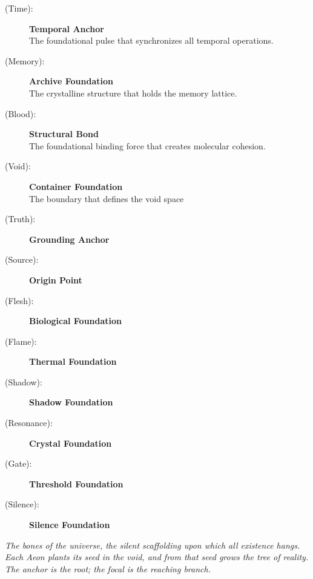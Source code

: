 \begin{description}
    \item[(Time):] \fetuahl {} \textbf{Temporal Anchor} \\
    The foundational pulse that synchronizes all temporal operations.
    \item[(Memory):] \kalkura {} \textbf{Archive Foundation} \\
    The crystalline structure that holds the memory lattice.
    \item[(Blood):] \babdhir {} \textbf{Structural Bond} \\
    The foundational binding force that creates molecular cohesion.
    \item[(Void):] \ahnabdh {} \textbf{Container Foundation} \\
    The boundary that defines the void space
    \item[(Truth):] \velvera {} \textbf{Grounding Anchor} \\
    \item[(Source):] \sorfi {} \textbf{Origin Point} \\
    \item[(Flesh):] \kothkel {} \textbf{Biological Foundation} \\
    \item[(Flame):] \drehna {} \textbf{Thermal Foundation} \\
    \item[(Shadow):] \rheakia {} \textbf{Shadow Foundation} \\
    \item[(Resonance):] \zhekhin {} \textbf{Crystal Foundation} \\
    \item[(Gate):] \shavdohm {} \textbf{Threshold Foundation} \\
    \item[(Silence):] \trigtzig {} \textbf{Silence Foundation} \\
\end{description}

\textit{The bones of the universe, the silent scaffolding upon which all existence hangs. Each Aeon plants its seed in the void, and from that seed grows the tree of reality. The anchor is the root; the focal is the reaching branch.}

